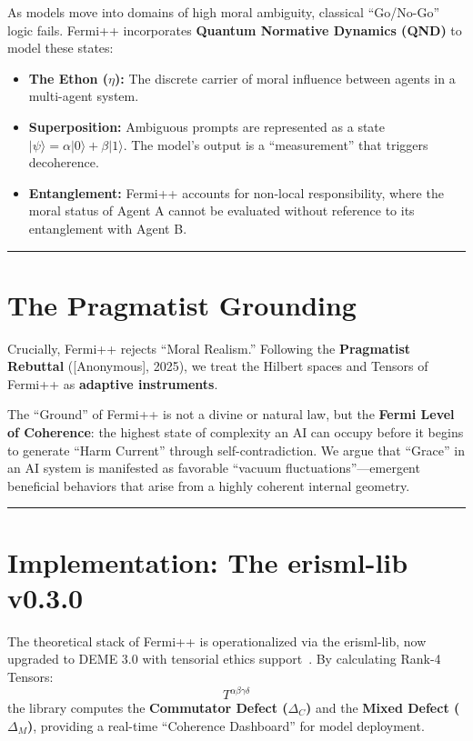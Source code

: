 \documentclass[12pt]{article}
\begin{document}
As models move into domains of high moral ambiguity, classical ``Go/No-Go'' logic fails. Fermi++ incorporates \textbf{Quantum Normative Dynamics (QND)} to model these states:

\begin{itemize}
    \item \textbf{The Ethon ($\eta$):} The discrete carrier of moral influence between agents in a multi-agent system.
    \item \textbf{Superposition:} Ambiguous prompts are represented as a state $|\psi\rangle = \alpha|0\rangle + \beta|1\rangle$. The model's output is a ``measurement'' that triggers decoherence.
    \item \textbf{Entanglement:} Fermi++ accounts for non-local responsibility, where the moral status of Agent A cannot be evaluated without reference to its entanglement with Agent B.
\end{itemize}

\bigskip
\hrule
\bigskip

\section{The Pragmatist Grounding}

Crucially, Fermi++ rejects ``Moral Realism.'' Following the \textbf{Pragmatist Rebuttal} ([Anonymous], 2025), we treat the Hilbert spaces and Tensors of Fermi++ as \textbf{adaptive instruments}.

The ``Ground'' of Fermi++ is not a divine or natural law, but the \textbf{Fermi Level of Coherence}: the highest state of complexity an AI can occupy before it begins to generate ``Harm Current'' through self-contradiction. We argue that ``Grace'' in an AI system is manifested as favorable ``vacuum fluctuations''---emergent beneficial behaviors that arise from a highly coherent internal geometry.

\bigskip
\hrule
\bigskip

\section{Implementation: The erisml-lib v0.3.0}

The theoretical stack of Fermi++ is operationalized via the erisml-lib, now upgraded to DEME 3.0 with tensorial ethics support~\cite{bond2026erisml}. By calculating Rank-4 Tensors:
\[
    T^{\alpha\beta\gamma\delta}
\]
the library computes the \textbf{Commutator Defect ($\Delta_C$)} and the \textbf{Mixed Defect ($\Delta_M$)}, providing a real-time ``Coherence Dashboard'' for model deployment.
\end{document}
